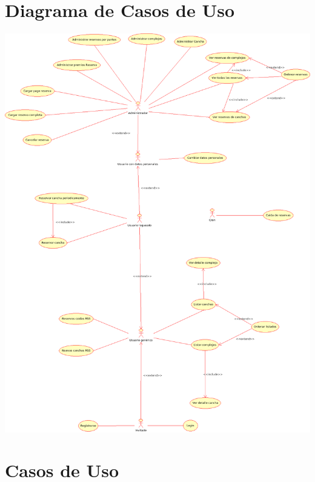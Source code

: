 \documentclass[a4paper,11pt]{article}
\begin{document}
\renewcommand{\theenumiii}{\arabic{enumiii}.}
\renewcommand{\labelenumiii}{\theenumiii}


\section{Diagrama de Casos de Uso}

\begin{center}
 \includegraphics[width=1.00\textwidth]{use_cases.png}
\end{center}

\section{Casos de Uso}


\end{document}
